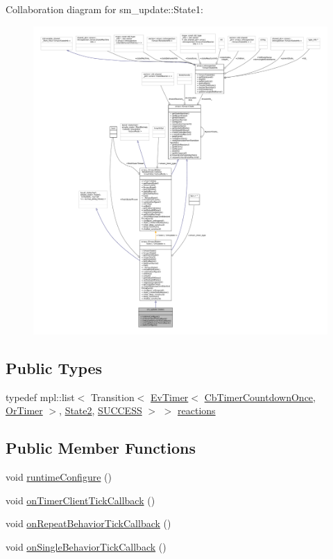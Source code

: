 Collaboration diagram for sm\+\_\+update\+:\+:State1\+:
\nopagebreak
\begin{figure}[H]
\begin{center}
\leavevmode
\includegraphics[width=350pt]{structsm__update_1_1State1__coll__graph}
\end{center}
\end{figure}
\subsection*{Public Types}
\begin{DoxyCompactItemize}
\item 
typedef mpl\+::list$<$ Transition$<$ \hyperlink{structros__timer__client_1_1EvTimer}{Ev\+Timer}$<$ \hyperlink{classros__timer__client_1_1CbTimerCountdownOnce}{Cb\+Timer\+Countdown\+Once}, \hyperlink{classsm__update_1_1OrTimer}{Or\+Timer} $>$, \hyperlink{structsm__update_1_1State2}{State2}, \hyperlink{structsmacc_1_1default__transition__tags_1_1SUCCESS}{S\+U\+C\+C\+E\+SS} $>$ $>$ \hyperlink{structsm__update_1_1State1_afecf0d56718ca6d3f567b2abf23641d8}{reactions}
\end{DoxyCompactItemize}
\subsection*{Public Member Functions}
\begin{DoxyCompactItemize}
\item 
void \hyperlink{structsm__update_1_1State1_ab41d1931619e35f24f6c7b6e6e6d0316}{runtime\+Configure} ()
\item 
void \hyperlink{structsm__update_1_1State1_ab4f7a38bc5323775b20ba5e8cc815a18}{on\+Timer\+Client\+Tick\+Callback} ()
\item 
void \hyperlink{structsm__update_1_1State1_ada025d5bb975eccc8fc7850bbb90f5dc}{on\+Repeat\+Behavior\+Tick\+Callback} ()
\item 
void \hyperlink{structsm__update_1_1State1_a88f30ef150b79e26b3c93a50a8dc1fa1}{on\+Single\+Behavior\+Tick\+Callback} ()
\end{DoxyCompactItemize}
